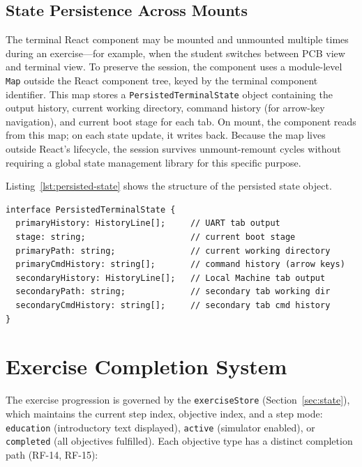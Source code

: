 \subsection{State Persistence Across Mounts}\label{subsec:terminal-persistence}

The terminal React component may be mounted and unmounted multiple times during an exercise---for example, when the student switches between PCB view and terminal view. To preserve the session, the component uses a module-level \texttt{Map} outside the React component tree, keyed by the terminal component identifier. This map stores a \texttt{PersistedTerminalState} object containing the output history, current working directory, command history (for arrow-key navigation), and current boot stage for each tab. On mount, the component reads from this map; on each state update, it writes back. Because the map lives outside React's lifecycle, the session survives unmount-remount cycles without requiring a global state management library for this specific purpose.

Listing~\ref{lst:persisted-state} shows the structure of the persisted state object.

\noindent\begin{minipage}{\linewidth}
\begin{lstlisting}[caption={Terminal state persisted across component mount cycles.}, label={lst:persisted-state}, language={}, basicstyle=\ttfamily\scriptsize]
interface PersistedTerminalState {
  primaryHistory: HistoryLine[];     // UART tab output
  stage: string;                     // current boot stage
  primaryPath: string;               // current working directory
  primaryCmdHistory: string[];       // command history (arrow keys)
  secondaryHistory: HistoryLine[];   // Local Machine tab output
  secondaryPath: string;             // secondary tab working dir
  secondaryCmdHistory: string[];     // secondary tab cmd history
}
\end{lstlisting}
\end{minipage}

\section{Exercise Completion System}\label{sec:completion}

The exercise progression is governed by the \texttt{exerciseStore} (Section~\ref{sec:state}), which maintains the current step index, objective index, and a step mode: \texttt{education} (introductory text displayed), \texttt{active} (simulator enabled), or \texttt{completed} (all objectives fulfilled). Each objective type has a distinct completion path (RF-14, RF-15):

